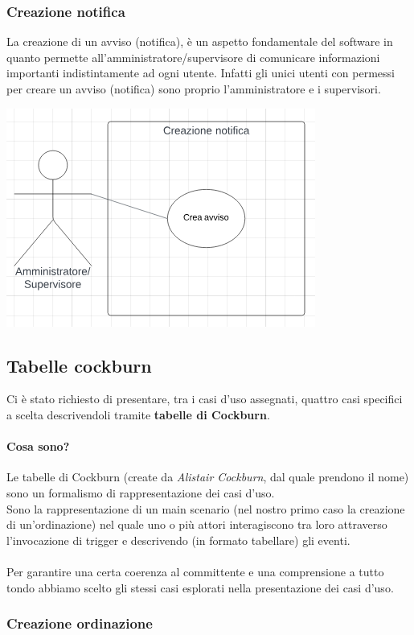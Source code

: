 \subsubsection{Creazione notifica}
La creazione di un avviso (notifica), è un aspetto fondamentale del software in quanto permette all'amministratore/supervisore di comunicare informazioni importanti indistintamente ad ogni utente. Infatti gli unici utenti con permessi per creare un avviso (notifica) sono proprio l'amministratore e i supervisori.
\begin{center}
  \includegraphics[scale=1.3]{img/use_case/use_case-creazione_notifica.png}
\end{center}
\newpage
\subsection{Tabelle cockburn}
Ci è stato richiesto di presentare, tra i casi d'uso assegnati, quattro casi
specifici a scelta descrivendoli tramite \textbf{tabelle di Cockburn}.
\paragraph{Cosa sono?} Le tabelle di Cockburn (create da \textit{Alistair Cockburn}, dal quale prendono il nome) sono un formalismo di rappresentazione dei casi d'uso.\\
Sono la rappresentazione di un main scenario (nel nostro primo caso la creazione di un'ordinazione) nel quale uno o più attori interagiscono
tra loro attraverso l'invocazione di trigger e descrivendo (in formato tabellare) gli eventi.
\\
\\Per garantire una certa coerenza al committente e una comprensione a tutto tondo abbiamo scelto gli stessi casi esplorati nella presentazione dei casi d'uso.
\subsubsection{Creazione ordinazione}

